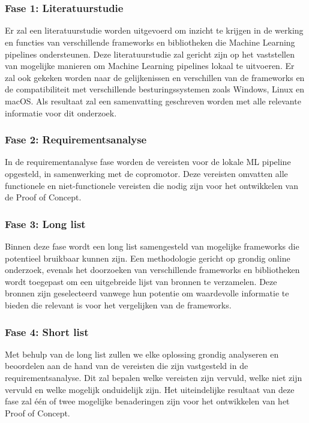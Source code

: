 
\chapter{}%
\label{ch:methodologie}

\subsection{Fase 1: Literatuurstudie}
Er zal een literatuurstudie worden uitgevoerd om inzicht te krijgen in de werking en
functies van verschillende frameworks en bibliotheken die Machine Learning pipelines ondersteunen.
Deze literatuurstudie zal gericht zijn op het vaststellen van mogelijke manieren om Machine Learning pipelines lokaal te uitvoeren. Er zal ook gekeken worden naar de gelijkenissen en verschillen van de frameworks en de compatibiliteit met verschillende besturingssystemen zoals Windows, Linux en macOS.
Als resultaat zal een samenvatting geschreven worden met alle relevante informatie voor dit onderzoek.
\subsection{Fase 2: Requirementsanalyse}
In de requirementanalyse fase worden de vereisten voor de lokale ML pipeline opgesteld, in samenwerking met de copromotor. Deze vereisten omvatten alle functionele en niet-functionele vereisten die nodig zijn voor het ontwikkelen van de Proof of Concept.

\subsection{Fase 3: Long list}
Binnen deze fase wordt een long list samengesteld van mogelijke frameworks die potentieel bruikbaar kunnen zijn. Een methodologie gericht op grondig online onderzoek, evenals het doorzoeken van verschillende frameworks en bibliotheken wordt toegepast om een uitgebreide lijst van bronnen te verzamelen. Deze bronnen zijn geselecteerd vanwege hun potentie om waardevolle informatie te bieden die relevant is voor het vergelijken van de frameworks.
\subsection{Fase 4: Short list}
Met behulp van de long list zullen we elke oplossing grondig analyseren en beoordelen aan de hand van de vereisten die zijn vastgesteld in de requirementsanalyse. Dit zal bepalen welke vereisten zijn vervuld, welke niet zijn vervuld en welke mogelijk onduidelijk zijn. Het uiteindelijke resultaat van deze fase zal één of twee mogelijke benaderingen zijn voor het ontwikkelen van het Proof of Concept.
